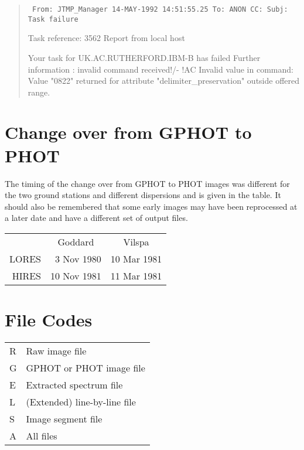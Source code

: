 \begin{quote}
{\small
\tt
From:	JTMP\_Manager 14-MAY-1992 14:51:55.25
\newline
To:	ANON
\newline
CC:	
\newline
Subj:	Task failure

Task reference: 3562
\newline
Report from local host

Your task for UK.AC.RUTHERFORD.IBM-B has failed
\newline
Further information :
\newline
invalid command received!/- !AC
\newline
Invalid value in command:  Value "0822" returned for attribute 
\newline
"delimiter\_preservation" outside offered range.
}
\end{quote}

\rm
\section {Change over from GPHOT to PHOT}
\label{change}

The timing of the change over from GPHOT to PHOT images was different for
the two ground stations and different dispersions and is given in the table.
It should also be remembered that some early images may have been reprocessed
at a later date and have a different set of output files.

\begin{center}
\begin{tabular}{rcc} 
	& Goddard & Vilspa \\
LORES	& ~3 Nov 1980 & 10 Mar 1981 \\
HIRES	& 10 Nov 1981 & 11 Mar 1981 \\

\end{tabular}
\end{center}

\section{File Codes}
\label{codes}

\begin{center}
\begin{tabular}{ll} 
R & Raw image file\\
G & GPHOT or PHOT image file\\
E & Extracted spectrum file\\
L & (Extended) line-by-line file\\
S & Image segment file\\
A & All files \\

\end{tabular}
\end{center}


